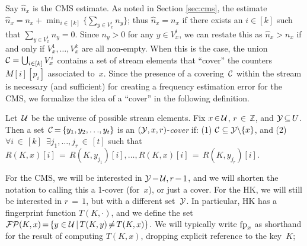 Say $\hat{n}_x$ is the CMS estimate.
As noted in Section \ref{sec:cms}, the estimate $\hat{n}_x = n_x + \min_{i \in [k]}\{\sum_{y \in V^i_x }n_y\}$; thus $\hat{n}_x = n_x$ if there exists an $i\in[k]$ such that $\sum_{y \in V^i_x }n_y=0$.  Since $n_y > 0$ for any $y \in V^{i}_x$, we
can restate this as $\hat{n}_x > n_x$ if and only if $V^{1}_x,\ldots,V^{k}_x$ are all non-empty.  When this is the case, 
the union $\mathcal{C} = \bigcup_{i\in[k]} V^{i}_x$ contains a set of stream elements that ``cover'' the counters $M[i][p_i]$ associated to~$x$. 
Since the presence of a covering~$\mathcal{C}$ within the stream is necessary (and sufficient)
for creating a frequency estimation error for the CMS, we formalize the idea of a ``cover'' in the following definition.

\begin{definition} Let~$\mathcal{U}$ be the universe of possible stream elements.  Fix $x \,{\in}\, \mathcal{U}$, $r\,{\in}\,\mathbb{Z}$, and $\mathcal{Y}\,{\subseteq}\,U$. Then a set~$\mathcal{C}\,{=}\,\{y_1,y_2,{\dots},y_t\}$ is an $(\mathcal{Y},x,r)$-\emph{cover} if: (1) $\mathcal{C}\subseteq \mathcal{Y}{\setminus}\{x\}$, and (2)$\forall i \,{\in}\, [k]\,$ $\exists j_1,\ldots,j_r\,{\in}\,[t]$ such that $R(K,x)[i]\,{=}\,R(K,y_{j_1})[i],{\ldots},R(K,x)[i]\,{=}\,R(K,y_{j_r})[i]$.
	\myenddef
\end{definition}

For the CMS, we will be interested in $\mathcal{Y}\,{=}\,\mathcal{U}, r\,{=}\,1$, and we will shorten the notation to calling this a 1-cover (for~$x$), or just a cover. 
For the HK, we will still be interested in $r\,{=}\,1$, but with a different set~$\mathcal{Y}$.   In particular, HK has a fingerprint function $T(K,\cdot)$, and we define the set $\mathcal{FP}(K,x)\,{=}\,\{y \in \mathcal{U} \,|\, T(K,y) \,{\not=}\, T(K,x)\}$. We will typically write $\textup{fp}_x$ as shorthand for the result of computing $T(K,x)$, dropping explicit reference to the key~$K$;   

